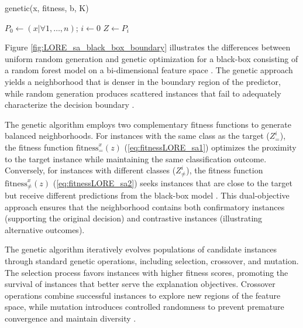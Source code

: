 \begin{algorithm}[ht]
\caption{genetic(x, fitness, b, K)}
\label{alg:geneticAlgoLORE_sa}
$P_0 \leftarrow (x | \forall 1, \ldots, n)$; $i \leftarrow 0$ 
$Z \leftarrow P_i$\;
\;
\end{algorithm}

Figure \ref{fig:LORE_sa_black_box_boundary} illustrates the differences between uniform random generation and genetic optimization for a black-box consisting of a random forest model on a bi-dimensional feature space \cite{guidotti2022stable}. The genetic approach yields a neighborhood that is denser in the boundary region of the predictor, while random generation produces scattered instances that fail to adequately characterize the decision boundary \cite{guidotti2022stable}.

The genetic algorithm employs two complementary fitness functions to generate balanced neighborhoods. For instances with the same class as the target ($Z_=^i$), the fitness function $\text{fitness}^{x}_{=}(z)$ (\ref{eq:fitnessLORE_sa1}) optimizes the proximity to the target instance while maintaining the same classification outcome. Conversely, for instances with different classes ($Z_{\neq}^i$), the fitness function $\text{fitness}^{x}_{\neq}(z)$ (\ref{eq:fitnessLORE_sa2}) seeks instances that are close to the target but receive different predictions from the black-box model \cite{guidotti2022stable}. This dual-objective approach ensures that the neighborhood contains both confirmatory instances (supporting the original decision) and contrastive instances (illustrating alternative outcomes).

The genetic algorithm iteratively evolves populations of candidate instances through standard genetic operations, including selection, crossover, and mutation. The selection process favors instances with higher fitness scores, promoting the survival of instances that better serve the explanation objectives. Crossover operations combine successful instances to explore new regions of the feature space, while mutation introduces controlled randomness to prevent premature convergence and maintain diversity \cite{guidotti2022stable}.

